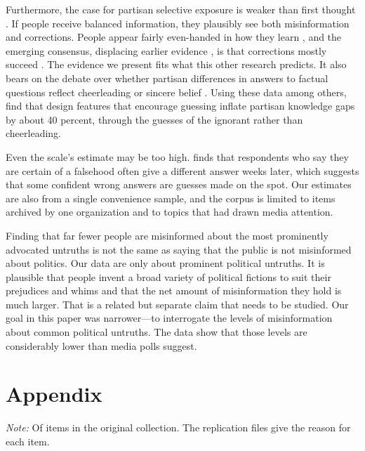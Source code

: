 \documentclass[11pt]{article}
\begin{document}
Furthermore, the case for partisan selective exposure is weaker than first thought \citep{gentzkow2011, prior2013}. If people receive balanced information, they plausibly see both misinformation and corrections. People appear fairly even-handed in how they learn \citep{khanna2018}, and the emerging consensus, displacing earlier evidence \citep{nyhan2010b}, is that corrections mostly succeed \citep{wood2019, guess2020, nyhan2020}. The evidence we present fits what this other research predicts. It also bears on the debate over whether partisan differences in answers to factual questions reflect cheerleading \citep{bullock2015, prior2015, schaffner2018} or sincere belief \citep{berinsky2018}. Using these data among others, \citet{shen2025} find that design features that encourage guessing inflate partisan knowledge gaps by about 40 percent, through the guesses of the ignorant rather than cheerleading.

Even the scale's estimate may be too high. \citet{graham2023} finds that respondents who say they are certain of a falsehood often give a different answer weeks later, which suggests that some confident wrong answers are guesses made on the spot. Our estimates are also from a single convenience sample, and the corpus is limited to items archived by one organization and to topics that had drawn media attention.

Finding that far fewer people are misinformed about the most prominently advocated untruths is not the same as saying that the public is not misinformed about politics. Our data are only about prominent political untruths. It is plausible that people invent a broad variety of political fictions to suit their prejudices and whims and that the net amount of misinformation they hold is much larger. That is a related but separate claim that needs to be studied. Our goal in this paper was narrower---to interrogate the levels of misinformation about common political untruths. The data show that those levels are considerably lower than media polls suggest.




\clearpage
\appendix
\section*{Appendix}
\setcounter{table}{0}
\renewcommand{\thetable}{A\arabic{table}}

\begin{table}[H]
\centering
\caption{Media-poll items excluded from the corpus}
\label{tab:exclusions}
\TableStyle

\begin{minipage}{0.85\linewidth}
\vspace{0.5em}\footnotesize \emph{Note:} Of \nCorpus{} items in the original collection. The replication files give the reason for each item.
\end{minipage}
\end{table}
\end{document}
